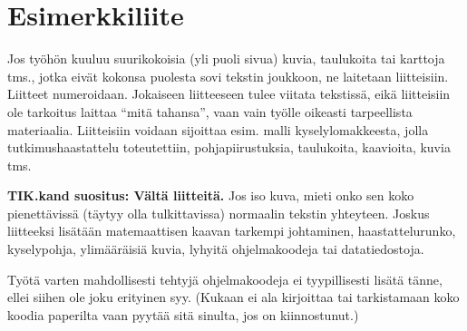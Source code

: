 
\section{Esimerkkiliite}
\label{sec:app1}

Jos työhön kuuluu suurikokoisia (yli puoli sivua) kuvia, taulukoita
tai karttoja tms., jotka eivät kokonsa puolesta sovi tekstin joukkoon,
ne laitetaan liitteisiin. Liitteet numeroidaan. Jokaiseen liitteeseen
tulee viitata tekstissä, eikä liitteisiin ole tarkoitus laittaa ``mitä
tahansa'', vaan vain työlle oikeasti tarpeellista
materiaalia. Liitteisiin voidaan sijoittaa esim. malli
kyselylomakkeesta, jolla tutkimushaastattelu toteutettiin,
pohjapiirustuksia, taulukoita, kaavioita, kuvia tms.

\textbf{TIK.kand suositus: Vältä liitteitä.} Jos iso kuva, mieti onko
sen koko pienettävissä (täytyy olla tulkittavissa) normaalin tekstin
yhteyteen. Joskus liitteeksi lisätään matemaattisen kaavan tarkempi
johtaminen, haastattelurunko, kyselypohja, ylimääräisiä kuvia, lyhyitä
ohjelmakoodeja tai datatiedostoja.

Työtä varten mahdollisesti tehtyjä ohjelmakoodeja ei tyypillisesti
lisätä tänne, ellei siihen ole joku erityinen syy. (Kukaan ei ala
kirjoittaa tai tarkistamaan koko koodia paperilta vaan pyytää sitä
sinulta, jos on kiinnostunut.)

%
%
%
%
